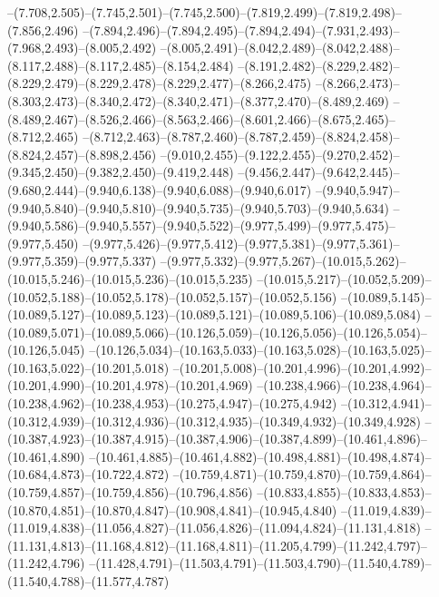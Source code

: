   --(7.708,2.505)--(7.745,2.501)--(7.745,2.500)--(7.819,2.499)--(7.819,2.498)--(7.856,2.496)%
  --(7.894,2.496)--(7.894,2.495)--(7.894,2.494)--(7.931,2.493)--(7.968,2.493)--(8.005,2.492)%
  --(8.005,2.491)--(8.042,2.489)--(8.042,2.488)--(8.117,2.488)--(8.117,2.485)--(8.154,2.484)%
  --(8.191,2.482)--(8.229,2.482)--(8.229,2.479)--(8.229,2.478)--(8.229,2.477)--(8.266,2.475)%
  --(8.266,2.473)--(8.303,2.473)--(8.340,2.472)--(8.340,2.471)--(8.377,2.470)--(8.489,2.469)%
  --(8.489,2.467)--(8.526,2.466)--(8.563,2.466)--(8.601,2.466)--(8.675,2.465)--(8.712,2.465)%
  --(8.712,2.463)--(8.787,2.460)--(8.787,2.459)--(8.824,2.458)--(8.824,2.457)--(8.898,2.456)%
  --(9.010,2.455)--(9.122,2.455)--(9.270,2.452)--(9.345,2.450)--(9.382,2.450)--(9.419,2.448)%
  --(9.456,2.447)--(9.642,2.445)--(9.680,2.444)--(9.940,6.138)--(9.940,6.088)--(9.940,6.017)%
  --(9.940,5.947)--(9.940,5.840)--(9.940,5.810)--(9.940,5.735)--(9.940,5.703)--(9.940,5.634)%
  --(9.940,5.586)--(9.940,5.557)--(9.940,5.522)--(9.977,5.499)--(9.977,5.475)--(9.977,5.450)%
  --(9.977,5.426)--(9.977,5.412)--(9.977,5.381)--(9.977,5.361)--(9.977,5.359)--(9.977,5.337)%
  --(9.977,5.332)--(9.977,5.267)--(10.015,5.262)--(10.015,5.246)--(10.015,5.236)--(10.015,5.235)%
  --(10.015,5.217)--(10.052,5.209)--(10.052,5.188)--(10.052,5.178)--(10.052,5.157)--(10.052,5.156)%
  --(10.089,5.145)--(10.089,5.127)--(10.089,5.123)--(10.089,5.121)--(10.089,5.106)--(10.089,5.084)%
  --(10.089,5.071)--(10.089,5.066)--(10.126,5.059)--(10.126,5.056)--(10.126,5.054)--(10.126,5.045)%
  --(10.126,5.034)--(10.163,5.033)--(10.163,5.028)--(10.163,5.025)--(10.163,5.022)--(10.201,5.018)%
  --(10.201,5.008)--(10.201,4.996)--(10.201,4.992)--(10.201,4.990)--(10.201,4.978)--(10.201,4.969)%
  --(10.238,4.966)--(10.238,4.964)--(10.238,4.962)--(10.238,4.953)--(10.275,4.947)--(10.275,4.942)%
  --(10.312,4.941)--(10.312,4.939)--(10.312,4.936)--(10.312,4.935)--(10.349,4.932)--(10.349,4.928)%
  --(10.387,4.923)--(10.387,4.915)--(10.387,4.906)--(10.387,4.899)--(10.461,4.896)--(10.461,4.890)%
  --(10.461,4.885)--(10.461,4.882)--(10.498,4.881)--(10.498,4.874)--(10.684,4.873)--(10.722,4.872)%
  --(10.759,4.871)--(10.759,4.870)--(10.759,4.864)--(10.759,4.857)--(10.759,4.856)--(10.796,4.856)%
  --(10.833,4.855)--(10.833,4.853)--(10.870,4.851)--(10.870,4.847)--(10.908,4.841)--(10.945,4.840)%
  --(11.019,4.839)--(11.019,4.838)--(11.056,4.827)--(11.056,4.826)--(11.094,4.824)--(11.131,4.818)%
  --(11.131,4.813)--(11.168,4.812)--(11.168,4.811)--(11.205,4.799)--(11.242,4.797)--(11.242,4.796)%
  --(11.428,4.791)--(11.503,4.791)--(11.503,4.790)--(11.540,4.789)--(11.540,4.788)--(11.577,4.787)%
